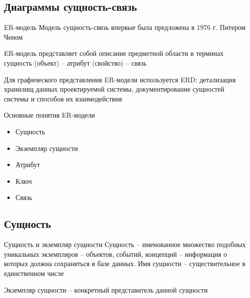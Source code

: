 \documentclass[12pt]{article}
\begin{document}
\newpage 

\subsection{Диаграммы сущность-связь}

\begin{defin}{ER-модель}
    Модель сущность-связь впервые была предложена в 1976 г. Питером Ченом 

    ER-модель представляет собой описание предметной области в терминах сущность (объект) -- атрибут (свойство) -- связь

    Для графического представления ER-модели используется ERD: детализация хранилищ данных проектируемой системы, документирование сущностей системы и способов их взаимодействия 
\end{defin}

\begin{nota}{Основные понятия ER-модели}
    \begin{itemize}
        \item Сущность 
        \item Экземпляр сущности 
        \item Атрибут 
        \item Ключ 
        \item Связь 
    \end{itemize}
\end{nota}

\newpage 

\subsection{Сущность}

\begin{defin}{Сущность и экземпляр сущности}
    Сущность -- именованное множество подобных уникальных экземпляров -- объектов, событий, концепций -- информация о которых должна сохраняться в базе данных. Имя сущности -- существительное в единственном числе 

    Экземпляр сущности -- конкретный представитель данной сущности 
\end{defin}
\end{document}
